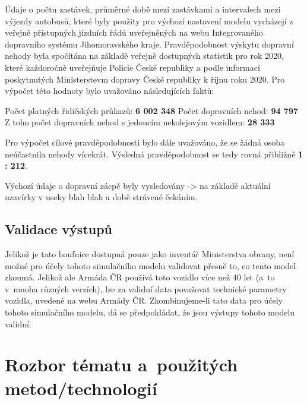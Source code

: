 \documentclass[a4paper]{article}
\begin{document}
            Údaje o počtu zastávek, průměrné době mezi zastávkami a intervalech mezi výjezdy autobusů, které byly použity pro výchozí nastavení modelu vycházejí z veřejně přístupných jízdních řádů uveřejněných na webu Integrovaného dopravního systému Jihomoravského kraje. 
            Pravděpodobnost výskytu dopravní nehody byla spočítána na základě veřejně dostupných statistik pro rok 2020, které každoročně uveřejňuje Policie České republiky a podle informací poskytnutých Ministerstevm dopravy České republiky k říjnu roku 2020. Pro výpočet této hodnoty bylo uvažováno následujících faktů:
            \begin{outline}
            	\1 Počet platných řidičských průkazů: \textbf{6 002 348}
            	\1 Počet dopravních nehod: \textbf{94 797}
            	\2 Z toho počet dopravních nehod s jedoucím nekolejovým vozidlem: \textbf{28 333}
            \end{outline}
            
            Pro výpočet cílové pravděpodobnosti bylo dále uvažováno, že se žádná osoba neúčastnila nehody vícekrát. Výsledná pravděpodobnost se tedy rovná přibližně \textbf{1 : 212}.
            
            Výchozí údaje o dopravní zácpě byly vysledovány -> na základě aktuální uzavírky v useky blah blah a době strávené čekáním. 

        \subsection{Validace výstupů}
        \label{subsec:validation}
			
			
			
            Jelikož je tato houfnice dostupná pouze jako inventář Ministerstva obrany, není možné pro účely tohoto simulačního modelu validovat přesně to, co tento model zkoumá.
            Jelikož ale Armáda ČR používá toto vozidlo více než 40 let (a~to v mnoha různých verzích), lze za validní data považovat technické parametry vozidla, uvedené na webu Armády ČR.
            Zkombinujeme-li tato data pro účely tohoto simulačního modelu, dá se předpokládat, že jsou výstupy tohoto modelu validní.

    \section{Rozbor tématu a~použitých metod/technologií}
    \label{sec:methods}
\end{document}

